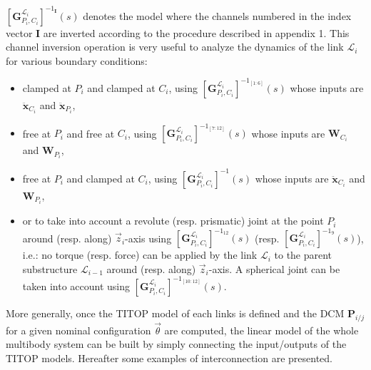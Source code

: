 $\left[\mathbf{G}_{P_i,C_i}^{\mathcal{L}_i}\right]^{-1_\mathbf{I}}(s)$ denotes the model where the channels numbered in the index vector $\mathbf{I}$ are inverted according to the procedure described in appendix 1. This channel inversion operation is very useful to analyze the dynamics of the link $\mathcal{L}_i$ for various boundary conditions:
\begin{itemize}
\item clamped at $P_i$ and clamped at $C_i$, using $\left[\mathbf{G}_{P_i,C_i}^{\mathcal{L}_i}\right]^{-1_{[1:6]}}(s)$ whose inputs are $\ddot{\mathbf{x}}_{C_i}$ and $\ddot{\mathbf{x}}_{P_i}$,
\item free at $P_i$ and free at $C_i$, using $\left[\mathbf{G}_{P_i,C_i}^{\mathcal{L}_i}\right]^{-1_{[7:12]}}(s)$ whose inputs are $\mathbf{W}_{C_i}$ and $\mathbf{W}_{P_i}$,
\item free at $P_i$ and clamped at $C_i$, using $\left[\mathbf{G}_{P_i,C_i}^{\mathcal{L}_i}\right]^{-1}(s)$ whose inputs are $\ddot{\mathbf{x}}_{C_i}$ and $\mathbf{W}_{P_i}$,
\item or to take into account a revolute (resp. prismatic) joint at the point $P_i$ around (resp. along) $\vec{z}_i$-axis using $\left[\mathbf{G}_{P_i,C_i}^{\mathcal{L}_i}\right]^{-1_{12}}(s)$ (resp. $\left[\mathbf{G}_{P_i,C_i}^{\mathcal{L}_i}\right]^{-1_{9}}(s)$), i.e.: no torque (resp. force) can be applied by the link $\mathcal{L}_i$ to the parent substructure $\mathcal{L}_{i-1}$ around (resp. along) $\vec{z}_i$-axis. A spherical joint can be taken into account using $\left[\mathbf{G}_{P_i,C_i}^{\mathcal{L}_i}\right]^{-1_{[10:12]}}(s)$.
\end{itemize}

More generally, once the TITOP model of each links is defined and the DCM $\mathbf{P}_{i/j}$ for a given nominal configuration $\vec{\theta}$ are computed,  the linear model of the whole multibody system can be built by simply connecting the input/outputs of the TITOP models. Hereafter some examples of interconnection are presented.


